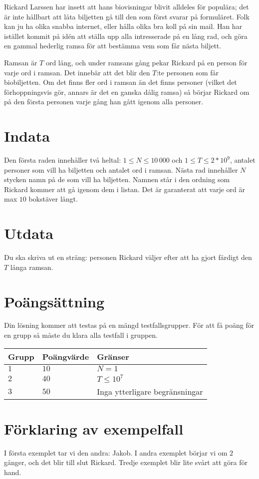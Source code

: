 Rickard Larssen har insett att hans biovisningar blivit alldeles för populära; det är inte hållbart att låta biljetten gå till den som först svarar på formuläret.
Folk kan ju ha olika snabba internet, eller hålla olika bra koll på sin mail. 
Han har istället kommit på idén att ställa upp alla intresserade på en lång rad, och göra en gammal hederlig ramsa för att bestämma vem som får nästa biljett. 

Ramsan är $T$ ord lång, och under ramsans gång pekar Rickard på en person för varje ord i ramsan. Det innebär att det blir den $T$:te personen som får biobiljetten. Om det finns fler ord i ramsan än det finns personer (vilket det förhoppningsvis gör, annars är det en ganska dålig ramsa) så börjar Rickard om på den första personen varje gång han gått igenom alla personer.

\section*{Indata}
Den första raden innehåller två heltal: $1 \leq N \leq 10\,000$ och $1\leq T \leq 2*10^9$, antalet personer som vill ha biljetten och antalet ord i ramsan.
Nästa rad innehåller $N$ stycken namn på de som vill ha biljetten. Namnen står i den ordning som Rickard kommer att gå igenom dem i listan.
Det är garanterat att varje ord är max $10$ bokstäver långt.

\section*{Utdata}
Du ska skriva ut en sträng: personen Rickard väljer efter att ha gjort färdigt den $T$ långa ramsan.

\section*{Poängsättning}
Din lösning kommer att testas på en mängd testfallsgrupper.
För att få poäng för en grupp så måste du klara alla testfall i gruppen.

\noindent
\begin{tabular}{| l | l | p{12cm} |}
  \hline
  Grupp & Poängvärde & Gränser \\ \hline
  $1$   & $10$       & $N=1$ \\ \hline
  $2$   & $40$       & $T \leq 10^7$ \\ \hline
  $3$   & $50$       & Inga ytterligare begränsningar \\ \hline
\end{tabular}

\section*{Förklaring av exempelfall}
I första exemplet tar vi den andra: Jakob.
I andra exemplet börjar vi om $2$ gånger, och det blir till slut Rickard.
Tredje exemplet blir lite svårt att göra för hand.
